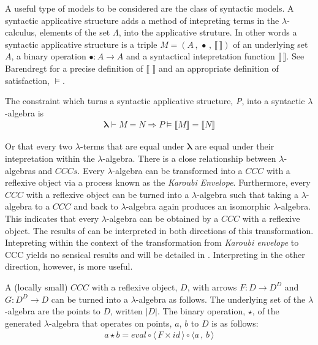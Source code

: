 A useful type of models to be considered are the class of syntactic models. A
syntactic applicative structure adds a method of intepreting terms in the
$\lambda$-calculus, elements of the set $\Lambda$, into the applicative
struture. In other words a syntactic applicative structure is a triple $M = (A
\, , \, \bullet \, , \, \llbracket \, \rrbracket)$ of an underlying set $A$, a
binary operation $\bullet : A \rightarrow A$ and a syntactical intepretation
function $\llbracket \, \rrbracket$. See Barendregt 
for a precise definition of $\llbracket \, \, \rrbracket$ and an appropriate definition of
satisfaction, $\vDash$.

The constraint which turns a syntactic applicative structure, \textit{P}, into a
syntactic $\lambda$-algebra is
\begin{align*}
    \bm{\lambda} \vdash M = N \Rightarrow P \models \llbracket M \rrbracket = \llbracket N
    \rrbracket
\end{align*}

Or that every two $\lambda$-terms that are equal under $\bm{\lambda}$ are equal
under their intepretation within the $\lambda$-algebra. There is a close
relationship between $\lambda$-algebras and $CCCs$. Every $\lambda$-algebra can
be transformed into a $CCC$ with a reflexive object via a process known as the
\textit{Karoubi Envelope}. Furthermore, every $CCC$ with a
reflexive object can be turned into a $\lambda$-algebra such that taking a
$\lambda$-algebra to a $CCC$ and back to $\lambda$-algebra again produces an
isomorphic $\lambda$-algebra. This indicates that every $\lambda$-algebra can
be obtained by a $CCC$ with a reflexive object. The results of  can be interpreted in both directions of this transformation.
Intepreting within the context of the transformation from \textit{Karoubi
envelope} to CCC yields no sensical results and will be detailed in
. Interpreting in the other direction, however, is more useful.


A (locally small) $CCC$ with a reflexive object, $D$, with arrows $F : D
\rightarrow D^D$ and $G : D^D \rightarrow D$ can be turned into a
$\lambda$-algebra as follows. The underlying set of the $\lambda$-algebra are
the points to $D$, written $|D|$. The binary operation, $\star$, of the
generated $\lambda$-algebra that operates on points, $a$, $b$ to $D$ is as
follows:
\begin{align*}
    a \star b = eval \circ \langle \, F \times id \, \rangle \circ \langle a \,
    , \, b \,
    \rangle
\end{align*}

